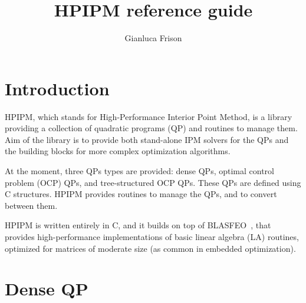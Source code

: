 \documentclass[a4paper]{report}
\title{HPIPM reference guide}
\author{Gianluca Frison}
\begin{document}
\maketitle
\tableofcontents





\chapter{Introduction}

HPIPM, which stands for High-Performance Interior Point Method, is a library providing a collection of quadratic programs (QP) and routines to manage them.
Aim of the library is to provide both stand-alone IPM solvers for the QPs and the building blocks for more complex optimization algorithms.

At the moment, three QPs types are provided: dense QPs, optimal control problem (OCP) QPs, and tree-structured OCP QPs.
These QPs are defined using C structures.
HPIPM provides routines to manage the QPs, and to convert between them.

HPIPM is written entirely in C, and it builds on top of BLASFEO~\cite{Frison2018}, that provides high-performance implementations of basic linear algebra (LA) routines, optimized for matrices of moderate size (as common in embedded optimization).



\chapter{Dense QP}
\end{document}

